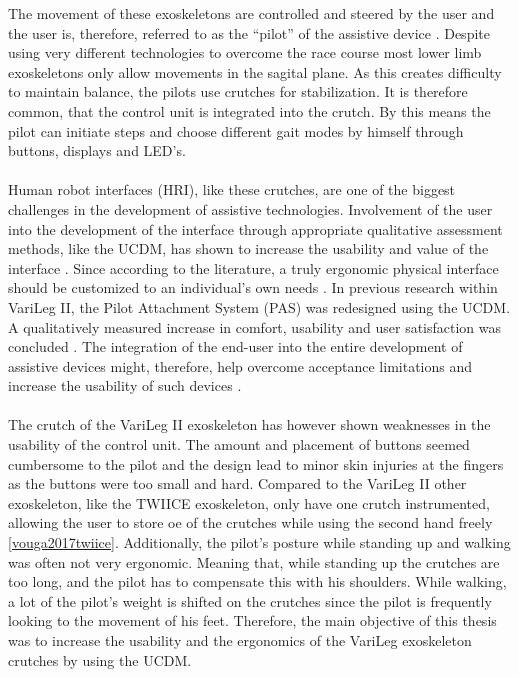 \documentclass[conference,a4paper]{IEEEtran}
\begin{document}
The movement of these exoskeletons are controlled and steered by the user and the user is, therefore, referred to as the “pilot” of the assistive device \cite{cybathlonwebpage}. Despite using very different technologies to overcome the race course most lower limb exoskeletons only allow movements in the sagital plane. As this creates difficulty to maintain balance, the pilots use crutches for stabilization. It is therefore common, that the control unit is integrated into the crutch. By this means the pilot can initiate steps and choose different gait modes by himself through buttons, displays and LED’s. \\
\\
Human robot interfaces (HRI), like these crutches, are one of the biggest challenges in the development of assistive technologies. Involvement of the user into the development of the interface through appropriate qualitative assessment methods, like the UCDM, has shown to increase the usability and value of the interface \cite{ritter2003}\cite{poulson1998userfit}\cite{blanco2016xassess}. Since according to the literature, a truly ergonomic physical interface should be customized to an individual’s own needs \cite{chen2016recent}. In previous research within VariLeg II, the Pilot Attachment System (PAS) was redesigned using the UCDM. A qualitatively measured increase in comfort, usability and user satisfaction was concluded \cite{janmeyer}. The integration of the end-user into the entire development of assistive devices might, therefore, help overcome acceptance limitations and increase the usability of such devices \cite{janmeyer}.  \\
\\
The crutch of the VariLeg II exoskeleton has however shown weaknesses in the usability of the control unit. The amount and placement of buttons seemed cumbersome to the pilot and the design lead to minor skin injuries at the fingers as the buttons were too small and hard. Compared to the VariLeg II other exoskeleton, like the TWIICE exoskeleton, only have one crutch instrumented, allowing the user to store oe of the crutches while using the second hand freely \ref{vouga2017twiice}. Additionally, the pilot’s posture while standing up and walking was often not very ergonomic. Meaning that, while standing up the crutches are too long, and the pilot has to compensate this with his shoulders. While walking, a lot of the pilot’s weight is shifted on the crutches since the pilot is frequently looking to the movement of his feet. Therefore, the main objective of this thesis was to increase the usability and the ergonomics of the VariLeg exoskeleton crutches by using the UCDM.
\end{document}
